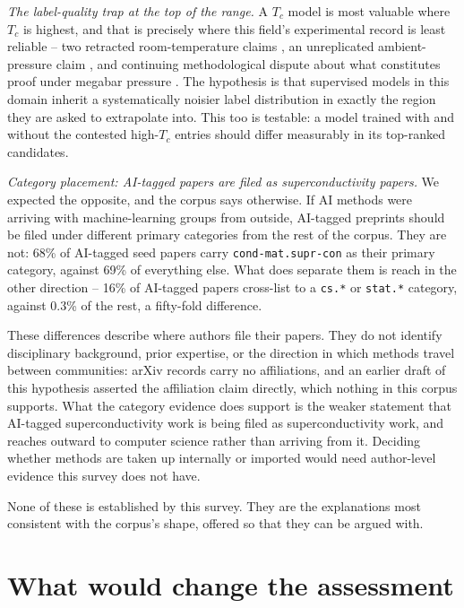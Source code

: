 \documentclass[
  11pt,
]{article}
\begin{document}
\emph{The label-quality trap at the top of the range.} A \(T_c\) model
is most valuable where \(T_c\) is highest, and that is precisely where
this field's experimental record is least reliable -- two retracted
room-temperature claims
\citep{snider2020retracted, dasenbrock2023retracted}, an unreplicated
ambient-pressure claim \citep{lee2023lk99}, and continuing
methodological dispute about what constitutes proof under megabar
pressure \citep{tallon2024flux}. The hypothesis is that supervised
models in this domain inherit a systematically noisier label
distribution in exactly the region they are asked to extrapolate into.
This too is testable: a model trained with and without the contested
high-\(T_c\) entries should differ measurably in its top-ranked
candidates.

\emph{Category placement: AI-tagged papers are filed as
superconductivity papers.} We expected the opposite, and the corpus says
otherwise. If AI methods were arriving with machine-learning groups from
outside, AI-tagged preprints should be filed under different primary
categories from the rest of the corpus. They are not: 68\% of AI-tagged
seed papers carry \texttt{cond-mat.supr-con} as their primary category,
against 69\% of everything else. What does separate them is reach in the
other direction -- 16\% of AI-tagged papers cross-list to a
\texttt{cs.*} or \texttt{stat.*} category, against 0.3\% of the rest, a
fifty-fold difference.

These differences describe where authors file their papers. They do not
identify disciplinary background, prior expertise, or the direction in
which methods travel between communities: arXiv records carry no
affiliations, and an earlier draft of this hypothesis asserted the
affiliation claim directly, which nothing in this corpus supports. What
the category evidence does support is the weaker statement that
AI-tagged superconductivity work is being filed as superconductivity
work, and reaches outward to computer science rather than arriving from
it. Deciding whether methods are taken up internally or imported would
need author-level evidence this survey does not have.

None of these is established by this survey. They are the explanations
most consistent with the corpus's shape, offered so that they can be
argued with.

\section{What would change the
assessment}\label{what-would-change-the-assessment}
\end{document}
